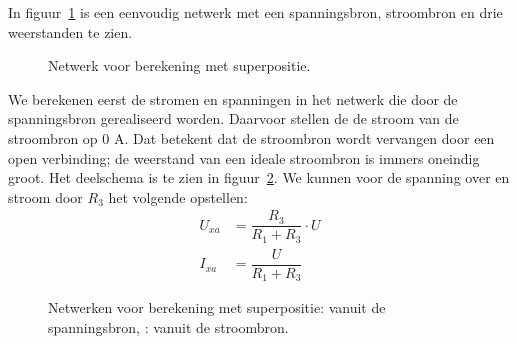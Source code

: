 In figuur~\ref{fig:gelnetwerkvoorsuperpositiebeginsel} is een eenvoudig
netwerk met een spanningsbron, stroombron en drie weerstanden te zien.

\begin{figure}[!ht]
\centering
{}
\caption{Netwerk voor berekening met superpositie.}
\label{fig:gelnetwerkvoorsuperpositiebeginsel}
\end{figure}

We berekenen eerst de stromen en spanningen in het netwerk die door de
spanningsbron gerealiseerd worden. Daarvoor stellen de de stroom van de
stroombron op 0 A. Dat betekent dat de stroombron wordt vervangen door
een open verbinding; de weerstand van een ideale stroombron is immers
oneindig groot. Het deelschema is te zien in
figuur~\ref{fig:gelnetwerkvoorsuperpositiebeginselsplita}. We kunnen
voor de spanning over en stroom door $R_3$ het volgende opstellen:
%
\begin{equation}
\begin{split}
U_{xa} &= \dfrac{R_3}{R_1+R_3}\cdot U \\
I_{xa} &= \dfrac{U}{R_1+R_3}
\end{split}
\end{equation}

\begin{figure}[!ht]
\centering
\begin{subfigure}{0.48\textwidth}
\centering
{}
\caption{}
\label{fig:gelnetwerkvoorsuperpositiebeginselsplita}
\end{subfigure}\hfill%
\begin{subfigure}{0.48\textwidth}
\centering
{}
\caption{}
\label{fig:gelnetwerkvoorsuperpositiebeginselsplitb}
\end{subfigure}
\captionsetup{width=0.8\textwidth}
\caption{Netwerken voor berekening met superpositie:  vanuit de spanningsbron, : vanuit de stroombron.}
\end{figure}

